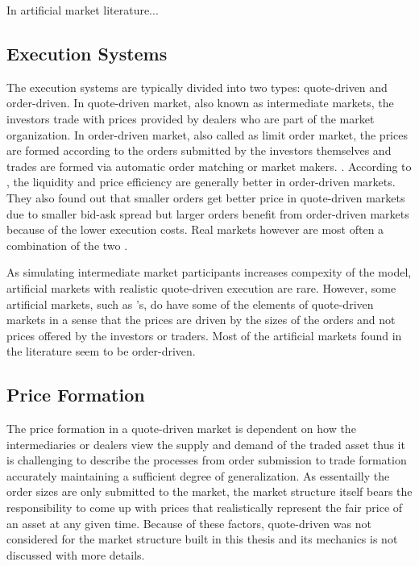 In artificial market literature...

\subsection{Execution Systems}
The execution systems are typically divided into two types:
quote-driven and order-driven. In quote-driven market, also known
as intermediate markets, the investors trade with prices provided 
by dealers who are part of the market organization. 
In order-driven market, also called as limit order market, 
the prices are formed according to the orders submitted by the 
investors themselves and trades are formed via automatic order matching 
or market makers. \citep{Baru17}. According to \citet{MALINOVA2013104},
the liquidity and price efficiency are generally better in order-driven 
markets. They also found out that smaller orders get better price in 
quote-driven markets due to smaller bid-ask spread 
but larger orders benefit from order-driven markets because of the lower 
execution costs. Real markets however are most often a combination
of the two \citep{boer05}.

As simulating intermediate market participants increases compexity
of the model, artificial markets with realistic quote-driven execution are rare. 
However, some artificial markets, such as \citet{SantaFe99}'s, do have some of 
the elements of quote-driven markets in a sense that the prices are driven by 
the sizes of the orders and not prices offered by the investors or traders. 
Most of the artificial markets found in the literature seem to be order-driven.


\subsection{Price Formation}
The price formation in a quote-driven market is dependent on how the 
intermediaries or dealers view the supply and demand of the traded
asset thus it is challenging to describe the processes from order submission
to trade formation accurately maintaining a sufficient degree of generalization.
As essentailly the order sizes are only submitted to the market, the market
structure itself bears the responsibility to come up with prices that realistically
represent the fair price of an asset at any given time. Because of these 
factors, quote-driven was not considered for the market structure built in this
thesis and its mechanics is not discussed with more details.

